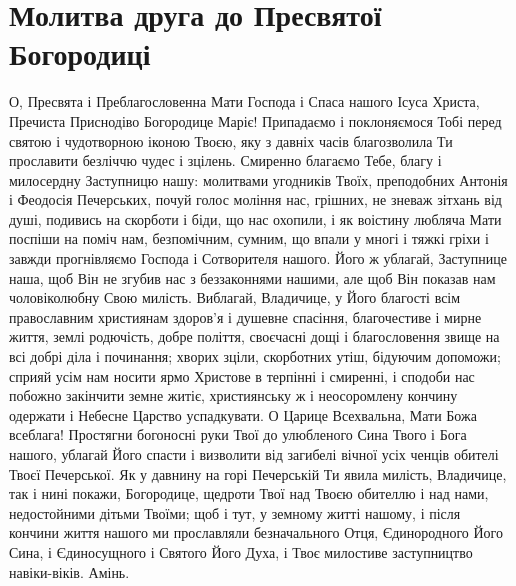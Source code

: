 \documentclass[chapters.tex]{subfiles}
\begin{document}
\section{Молитва друга до Пресвятої Богородиці}
О, Пресвята і Преблагословенна Мати Господа і Спаса нашого Ісуса Христа, Пречиста Приснодіво Богородице Маріє! Припадаємо і поклоняємося Тобі перед святою і чудотворною іконою Твоєю, яку з давніх часів благозволила Ти прославити безліччю чудес і зцілень. Смиренно благаємо Тебе, благу і милосердну Заступницю нашу: молитвами угодників Твоїх, преподобних Антонія і Феодосія Печерських, почуй голос моління нас, грішних, не зневаж зітхань від душі, подивись на скорботи і біди, що нас охопили, і як воістину любляча Мати поспіши на поміч нам, безпомічним, сумним, що впали у многі і тяжкі гріхи і завжди прогнівляємо Господа і Сотворителя нашого. Його ж ублагай, Заступнице наша, щоб Він не згубив нас з беззаконнями нашими, але щоб Він показав нам чоловіколюбну Свою милість. Виблагай, Владичице, у Його благості всім православним християнам здоров’я і душевне спасіння, благочестиве і мирне життя, землі родючість, добре поліття, своєчасні дощі і благословення звище на всі добрі діла і починання; хворих зціли, скорботних утіш, бідуючим допоможи; сприяй усім нам носити ярмо Христове в терпінні і смиренні, і сподоби нас побожно закінчити земне житіє, християнську ж і неосоромлену кончину одержати і Небесне Царство успадкувати. О Царице Всехвальна, Мати Божа всеблага! Простягни богоносні руки Твої до улюбленого Сина Твого і Бога нашого, ублагай Його спасти і визволити від загибелі вічної усіх ченців обителі Твоєї Печерської. Як у давнину на горі Печерській Ти явила милість, Владичице, так і нині покажи, Богородице, щедроти Твої над Твоєю обителлю і над нами, недостойними дітьми Твоїми; щоб і тут, у земному житті нашому, і після кончини життя нашого ми прославляли безначального Отця, Єдинородного Його Сина, і Єдиносущного і Святого Його Духа, і Твоє милостиве заступництво навіки-віків. Амінь.
\end{document}
